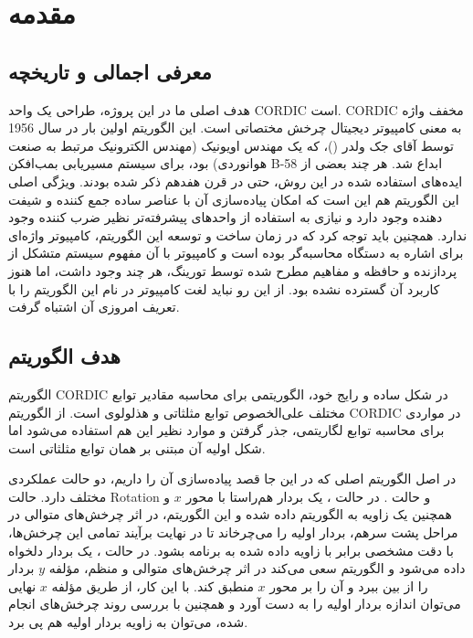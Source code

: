 \documentclass[12pt,titlepage,a4page , tikz , multi,table , svgnames,xcdraw]{article}
\begin{document}
\newpage
\pagestyle{fancy}
\fancyhf{}
\fancyfoot{}

\cfoot{\thepage}

\tableofcontents

\newpage

\section{مقدمه}

\subsection{معرفی اجمالی و تاریخچه}
هدف اصلی ما در این پروژه، طراحی یک واحد CORDIC است. CORDIC مخفف واژه  به معنی کامپیوتر دیجیتال چرخش مختصاتی است. این الگوریتم اولین بار در سال 1956 توسط آقای جک ولدر ()،‌ که یک مهندس اویونیک (مهندس الکترونیک مرتبط به صنعت هوانوردی) بود،‌ برای سیستم مسیریابی بمب‌افکن B-58 ابداع شد. هر چند بعضی از ایده‌های استفاده شده در این روش،‌ حتی در قرن هفدهم ذکر شده بودند. ویژگی اصلی این الگوریتم هم این است که امکان پیاده‌سازی آن با عناصر ساده جمع کننده و شیفت دهنده وجود دارد و نیازی به استفاده از واحدهای پیشرفته‌تر نظیر ضرب کننده وجود ندارد. همچنین باید توجه کرد که در زمان ساخت و توسعه این الگوریتم، کامپیوتر واژه‌ای برای اشاره به دستگاه محاسبه‌گر بوده است و کامپیوتر با آن مفهوم سیستم متشکل از پردازنده و حافظه و مفاهیم مطرح شده توسط تورینگ، هر چند وجود داشت،‌ اما هنوز کاربرد آن گسترده نشده بود. از این رو نباید لغت کامپیوتر در نام این الگوریتم را با تعریف امروزی آن اشتباه گرفت. \cite{birth} \cite{volder}



\subsection{هدف الگوریتم}
الگوریتم CORDIC در شکل ساده و رایج خود،‌ الگوریتمی برای محاسبه مقادیر توابع مختلف علی‌الخصوص توابع مثلثاتی و هذلولوی است. از الگوریتم CORDIC در مواردی برای محاسبه توابع لگاریتمی،‌ جذر گرفتن و موارد نظیر این هم استفاده می‌شود اما شکل اولیه آن مبتنی بر همان توابع مثلثاتی است.

در اصل الگوریتم اصلی که در این جا قصد پیاده‌سازی آن را داریم،‌ دو حالت عملکردی مختلف دارد. حالت Rotation و حالت . در حالت ، یک بردار هم‌راستا با محور $x$ و همچنین یک زاویه به الگوریتم داده شده و این الگوریتم، در اثر چرخش‌های متوالی در مراحل پشت سرهم، بردار اولیه را می‌چرخاند تا در نهایت برآیند تمامی این چرخش‌ها،‌ با دقت مشخصی برابر با زاویه داده شده به برنامه بشود. در حالت ، یک بردار دلخواه داده می‌شود و الگوریتم سعی می‌کند در اثر چرخش‌های متوالی و منظم، مؤلفه $y$ بردار را از بین ببرد و آن را بر محور $x$ منطبق کند. با این کار، از طریق مؤلفه $x$ نهایی می‌توان اندازه بردار اولیه را به دست آورد و همچنین با بررسی روند چرخش‌های انجام شده،‌ می‌توان به زاویه بردار اولیه هم پی برد. \cite{volder} \cite{lakshmi} \cite{andraka}
\end{document}
